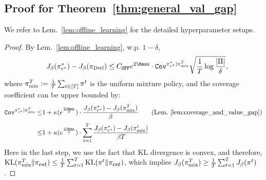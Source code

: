 \subsection{Proof for Theorem~\ref{thm:general_val_gap}}\label{appx:proof_offline_policy_gap}

\ThmOnlineOffline*
We refer to Lem.~\ref{lem:offline_learning} for the detailed hyperparameter setups.
\begin{proof}
    By Lem.~\ref{lem:offline_learning}, w.p. $1-\delta$,
    \begin{align*}
        \quad J_\beta(\pi^*_{r^*}) - J_\beta(\pi_\SELF) \leq C_\Offline e^{2{\Rmax}}\cdot \cov^{\pi^*_{r^*}|\pi_\mix^T}\sqrt{\frac{1}{T}\log\frac{|\Pi|}{\delta}},
    \end{align*}
    where $\pi_{\text{mix}}^T:=\frac{1}{T}\sum_{t\in[T]}\pi^t$ is the uniform mixture policy, and the coverage coefficient can be upper bounded by:
    \begin{align*}
        \cov^{\pi^*_{r^*}|\pi_\mix^T}\leq &  1 + \kappa(e^{\frac{2{\Rmax}}{\beta}}) \cdot \frac{J_\beta(\pi^*_{r^*}) - J_\beta({\pi^T_\mix})}{\beta} \tag{Lem.~\ref{lem:coverage_and_value_gap}}\\
        \leq & 1 + \kappa(e^{\frac{2{\Rmax}}{\beta}}) \cdot \sum_{t=1}^T \frac{J_\beta(\pi^*_{r^*}) - J_\beta({\pi^t_\mix})}{\beta T}
    \end{align*}
    Here in the last step, we use the fact that KL divergence is convex, and therefore, $\text{KL}(\pi^T_{\text{mix}}\|\pi_{\texttt{ref}}) \leq \frac{1}{T}\sum_{t=1}^T \text{KL}(\pi^t \| \pi_{\texttt{ref}})$, which implies $J_\beta(\pi^T_{\text{mix}}) \geq \frac{1}{T} \sum_{t=1}^T J_\beta(\pi^t)$.

\end{proof}


